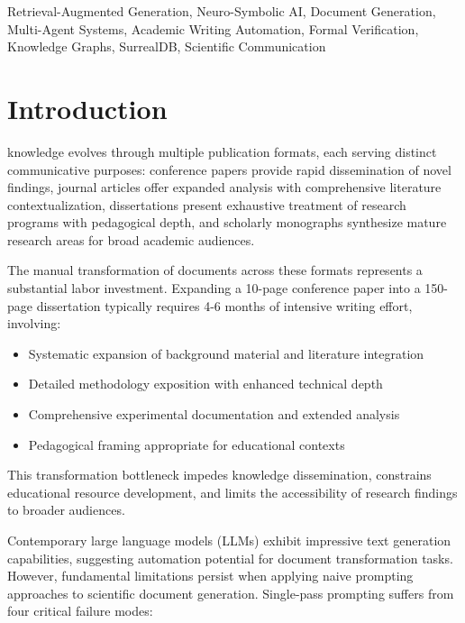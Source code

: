 \documentclass{ieeeaccess}
\begin{document}
\begin{keywords}
Retrieval-Augmented Generation, Neuro-Symbolic AI, Document Generation, Multi-Agent Systems, Academic Writing Automation, Formal Verification, Knowledge Graphs, SurrealDB, Scientific Communication
\end{keywords}

\maketitle

\section{Introduction}\label{sec:introduction}

 knowledge evolves through multiple publication formats, each serving distinct communicative purposes: conference papers provide rapid dissemination of novel findings, journal articles offer expanded analysis with comprehensive literature contextualization, dissertations present exhaustive treatment of research programs with pedagogical depth, and scholarly monographs synthesize mature research areas for broad academic audiences. 

The manual transformation of documents across these formats represents a substantial labor investment. Expanding a 10-page conference paper into a 150-page dissertation typically requires 4-6 months of intensive writing effort, involving:
\begin{itemize}
\item Systematic expansion of background material and literature integration
\item Detailed methodology exposition with enhanced technical depth
\item Comprehensive experimental documentation and extended analysis
\item Pedagogical framing appropriate for educational contexts
\end{itemize}
This transformation bottleneck impedes knowledge dissemination, constrains educational resource development, and limits the accessibility of research findings to broader audiences.

Contemporary large language models (LLMs) exhibit impressive text generation capabilities, suggesting automation potential for document transformation tasks. However, fundamental limitations persist when applying naive prompting approaches to scientific document generation. Single-pass prompting suffers from four critical failure modes:
\end{document}
